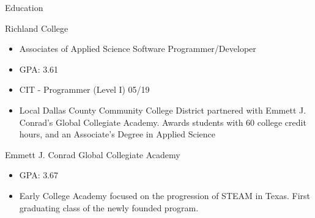 \documentclass{article}
\newlength{\tabin}
\newlength{\secsep}
\newcommand{\lineunder}{\vspace*{-8pt} \\ \hspace*{-6pt} \hrulefill \\ \vspace*{-15pt}}
\newenvironment{tabbedsection}[1]{
  \begin{list}{}{
      \setlength{\itemsep}{0pt}
      \setlength{\labelsep}{0pt}
      \setlength{\labelwidth}{0pt}
      \setlength{\leftmargin}{\tabin}
      \setlength{\rightmargin}{\tabin}
      \setlength{\listparindent}{0pt}
      \setlength{\parsep}{0pt}
      \setlength{\parskip}{0pt}
      \setlength{\partopsep}{0pt}
      \setlength{\topsep}{#1}
    }
  \item[]
}{\end{list}}
\newenvironment{resume_section}[1]{
  \filbreak
  \vspace{2\secsep}
  \textsc{\large#1}
  \lineunder
  \begin{tabbedsection}{\secsep}
}{\end{tabbedsection}}
\newenvironment{resume_subsection}[2][]{
  \textbf{#2} \hfill {\footnotesize #1} \hspace{2em}
  \begin{tabbedsection}{0.5\secsep}
}{\end{tabbedsection}}
\newenvironment{subitems}{
  \renewcommand{\labelitemi}{-}
  \begin{itemize}
      \setlength{\labelsep}{1em}
}{\end{itemize}}
\begin{document}

\begin{resume_section}{Education}
  \begin{resume_subsection}[Dallas, TX (2016--2020)]{Richland College}
    \begin{subitems}
    \item Associates of Applied Science Software Programmer/Developer
     \item GPA: 3.61
      \item CIT - Programmer (Level I) 05/19
      \item Local Dallas County Community College District partnered with Emmett J. Conrad’s Global Collegiate Academy. Awards students with 60 college credit hours, and an Associate’s Degree in Applied Science
    \end{subitems}
  \end{resume_subsection}
  
  
  \begin{resume_subsection}[Dallas, TX (2016--2020)]{Emmett J. Conrad Global Collegiate Academy}
    \begin{subitems}
     \item GPA: 3.67
      \item Early College Academy focused on the progression of STEAM in Texas. First graduating class of the newly founded program.

     \end{subitems}
  \end{resume_subsection}
\end{resume_section}

\end{document}
